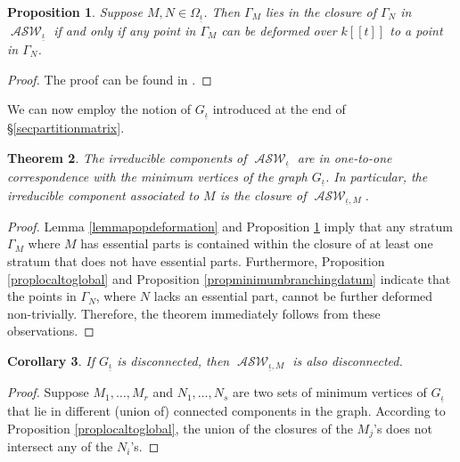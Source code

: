 \documentclass{compositio}
\newtheorem{theorem}{Theorem}[section]
\newtheorem{proposition}[theorem]{Proposition}
\newtheorem{corollary}[theorem]{Corollary}
\theoremstyle{remark}
\theoremstyle{remark}
\DeclareMathOperator{\ASW}{\mathcal{ASW}}
\begin{document}
\begin{proposition}
\label{propclosuredeformation}
Suppose $M, N \in \Omega_{\underline{\iota}}$. Then $\Gamma_{M}$ lies in the closure of $\Gamma_{N}$ in $\ASW_{\underline{\iota}}$ if and only if any point in $\Gamma_{M}$ can be deformed over $k[[t]]$ to a point in $\Gamma_{N}$.
\end{proposition}

\begin{proof}
The proof can be found in \cite[Proposition 3.4]{DANG2020398}.
\end{proof}

We can now employ the notion of $G_{\underline{\iota}}$ introduced at the end of \S \ref{secpartitionmatrix}.

\begin{theorem}
\label{theoremirredcomponent}
The irreducible components of $\ASW_{\underline{\iota}}$ are in one-to-one correspondence with the minimum vertices of the graph $G_{\underline{\iota}}$. In particular, the irreducible component associated to $M$ is the closure of $\ASW_{\underline{\iota},M}$.
\end{theorem}

\begin{proof}
Lemma \ref{lemmapopdeformation} and Proposition \ref{propclosuredeformation} imply that any stratum $\Gamma_M$ where $M$ has essential parts is contained within the closure of at least one stratum that does not have essential parts. Furthermore, Proposition \ref{proplocaltoglobal} and Proposition \ref{propminimumbranchingdatum} indicate that the points in $\Gamma_N$, where $N$ lacks an essential part, cannot be further deformed non-trivially. Therefore, the theorem immediately follows from these observations.
\end{proof}

\begin{corollary}
If $G_{\underline{\iota}}$ is disconnected, then $\ASW_{\underline{\iota},M}$ is also disconnected.
\end{corollary}

\begin{proof}
Suppose ${M_1, \ldots, M_r}$ and ${N_1, \ldots, N_s}$ are two sets of minimum vertices of $G_{\underline{\iota}}$ that lie in different (union of) connected components in the graph. According to Proposition \ref{proplocaltoglobal}, the union of the closures of the $M_j$'s does not intersect any of the $N_i$'s. 
\end{proof}
\end{document}

